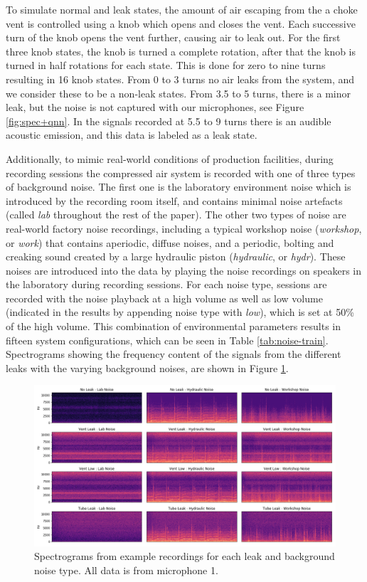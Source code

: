To simulate normal and leak states, the amount of air escaping from the a choke vent is controlled using a knob which opens and closes the vent. Each successive turn of the knob opens the vent further, causing air to leak out. For the first three knob states, the knob is turned a complete rotation, after that the knob is turned in half rotations for each state. This is done for zero to nine turns resulting in 16 knob states. From 0 to 3 turns no air leaks from the system, and we consider these to be a non-leak states. From 3.5 to 5 turns, there is a minor leak, but the noise is not captured with our microphones, see Figure \ref{fig:spec+qnn}. In the signals recorded at 5.5 to 9 turns there is an audible acoustic emission, and this data is labeled as a leak state. 

Additionally, to mimic real-world conditions of production facilities, during recording sessions the compressed air system is recorded with one of three types of background noise. The first one is the laboratory environment noise which is introduced by the recording room itself, and contains minimal noise artefacts (called \textit{lab} throughout the rest of the paper). The other two types of noise are real-world factory noise recordings, including a typical workshop noise (\textit{workshop}, or \textit{work}) that contains aperiodic, diffuse noises, and a periodic, bolting and creaking sound created by a large hydraulic piston (\textit{hydraulic}, or \textit{hydr}). These noises are introduced into the data by playing the noise recordings on speakers in the laboratory during recording sessions. For each noise type, sessions are recorded with the noise playback at a high volume as well as low volume (indicated in the results by appending noise type with \textit{low}), which is set at 50\% of the high volume. This combination of environmental parameters results in fifteen system configurations, which can be seen in Table \ref{tab:noise-train}. Spectrograms showing the frequency content of the signals from the different leaks with the varying background noises, are shown in Figure \ref{fig:specs}. 

\begin{figure}[h]
	\centering
	\includegraphics[width=0.95\columnwidth]{images/specs.png}
	\caption{Spectrograms from example recordings for each leak and background noise type. All data is from microphone 1.}
	\label{fig:specs}
\end{figure}

